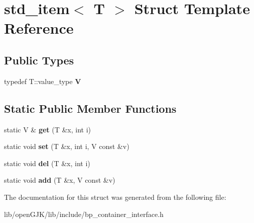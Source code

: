 \hypertarget{structstd__item}{}\section{std\+\_\+item$<$ T $>$ Struct Template Reference}
\label{structstd__item}
\subsection*{Public Types}
\begin{DoxyCompactItemize}
\item 
\mbox{\label{structstd__item_a978c5a033f4aba8658e24665dfe0536b}} 
typedef T\+::value\+\_\+type {\bfseries V}
\end{DoxyCompactItemize}
\subsection*{Static Public Member Functions}
\begin{DoxyCompactItemize}
\item 
\mbox{\label{structstd__item_a21e077b289a3ff0499cf32752ebdc099}} 
static V \& {\bfseries get} (T \&x, int i)
\item 
\mbox{\label{structstd__item_a29cf4c955bf3361a3464da7d408446b9}} 
static void {\bfseries set} (T \&x, int i, V const \&v)
\item 
\mbox{\label{structstd__item_afffd0335edf3bfa82c47981ba5707a4c}} 
static void {\bfseries del} (T \&x, int i)
\item 
\mbox{\label{structstd__item_a4f8c0188ad4ecf94723d432509dbc334}} 
static void {\bfseries add} (T \&x, V const \&v)
\end{DoxyCompactItemize}


The documentation for this struct was generated from the following file\+:\begin{DoxyCompactItemize}
\item 
lib/open\+G\+J\+K/lib/include/bp\+\_\+container\+\_\+interface.\+h\end{DoxyCompactItemize}
